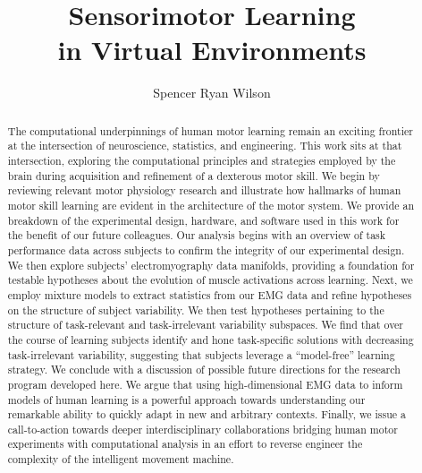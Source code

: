 \title{Sensorimotor Learning\\in Virtual Environments}
\author{Spencer Ryan Wilson}

\maketitle

\makedeclaration

\begin{abstract} %

The computational underpinnings of human motor learning remain an exciting frontier at the intersection of neuroscience, statistics, and engineering. This work sits at that intersection, exploring the computational principles and strategies employed by the brain during acquisition and refinement of a dexterous motor skill. We begin by reviewing relevant motor physiology research and illustrate how hallmarks of human motor skill learning are evident in the architecture of the motor system. We provide an breakdown of the experimental design, hardware, and software used in this work for the benefit of our future colleagues. Our analysis begins with an overview of task performance data across subjects to confirm the integrity of our experimental design. We then explore subjects' electromyography data manifolds, providing a foundation for testable hypotheses about the evolution of muscle activations across learning. Next, we employ mixture models to extract statistics from our EMG data and refine hypotheses on the structure of subject variability. We then test hypotheses pertaining to the structure of task-relevant and task-irrelevant variability subspaces. We find that over the course of learning subjects identify and hone task-specific solutions with decreasing task-irrelevant variability, suggesting that subjects leverage a ``model-free'' learning strategy. We conclude with a discussion of possible future directions for the research program developed here. We argue that using high-dimensional EMG data to inform models of human learning is a powerful approach towards understanding our remarkable ability to quickly adapt in new and arbitrary contexts. Finally, we issue a call-to-action towards deeper interdisciplinary collaborations bridging human motor experiments with computational analysis in an effort to reverse engineer the complexity of the intelligent movement machine.

\end{abstract}

